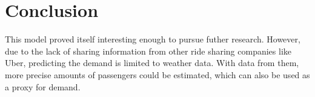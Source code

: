 \documentclass[11pt]{article}
\begin{document}

\section{Conclusion}

This model proved itself interesting enough to pursue futher research. However, due to the lack of sharing information from other ride sharing companies like Uber, predicting the demand is limited to weather data. With data from them, more precise amounts of passengers could be estimated, which can also be used as a proxy for demand.


\clearpage

\printbibliography
\end{document}
